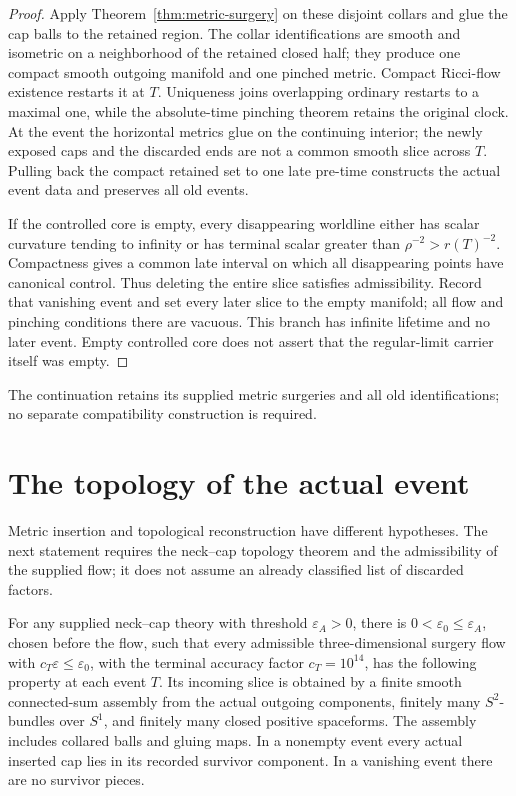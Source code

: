 \begin{proof}
Apply Theorem~\ref{thm:metric-surgery} on these disjoint collars and
glue the cap balls to the retained region.  The collar identifications
are smooth and isometric on a neighborhood of the retained closed
half; they produce one compact smooth outgoing manifold and one
pinched metric.  Compact Ricci-flow existence restarts it at $T$.
Uniqueness joins overlapping ordinary restarts to a maximal one,
while the absolute-time pinching theorem retains the original clock.
At the event the horizontal metrics glue on the continuing interior;
the newly exposed caps and the discarded ends are not a common smooth
slice across $T$.  Pulling back the compact retained set to one late
pre-time constructs the actual event data and preserves all old events.

If the controlled core is empty, every disappearing worldline either
has scalar curvature tending to infinity or has terminal scalar
greater than $\rho^{-2}>r(T)^{-2}$.  Compactness gives a common late
interval on which all disappearing points have canonical control.
Thus deleting the entire slice satisfies admissibility.  Record that
vanishing event and set every later slice to the empty manifold; all
flow and pinching conditions there are vacuous.  This branch has
infinite lifetime and no later event.  Empty controlled core does not
assert that the regular-limit carrier itself was empty.
\end{proof}

The continuation retains its supplied metric surgeries and all old
identifications; no separate compatibility construction is required.

\section{The topology of the actual event}
\label{sec:surgery-event-topology}

Metric insertion and topological reconstruction have different hypotheses.
The next statement requires the neck--cap topology theorem and the
admissibility of the supplied flow; it does not assume an already
classified list of discarded factors.

\begin{theorem}
\label{thm:surgery-local-topology}
For any supplied neck--cap theory with threshold $\varepsilon_A>0$,
there is $0<\varepsilon_0\leq\varepsilon_A$, chosen before the flow,
such that every admissible three-dimensional surgery flow with
$c_T\varepsilon\leq\varepsilon_0$, with the terminal accuracy factor
$c_T=10^{14}$, has the following property at each
event $T$.  Its incoming slice is obtained by a finite smooth
connected-sum assembly from the actual outgoing components, finitely
many $S^2$-bundles over $S^1$, and finitely many closed positive
spaceforms.  The assembly includes collared balls and gluing maps.
In a nonempty event every actual inserted cap lies in its recorded
survivor component.  In a vanishing event there are no survivor pieces.
\cite[Proposition 15.3, pp. 357--358]{MT2007}
\end{theorem}

